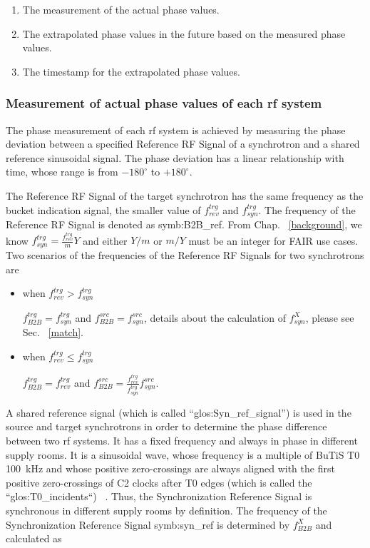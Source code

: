 \begin{enumerate}
\item The measurement of the actual phase values.
\item The extrapolated phase values in the future based on the measured phase values.
\item The timestamp for the extrapolated phase values.
\end{enumerate}
 \subsubsection{Measurement of actual phase values of each rf system}
The phase measurement of each rf system is achieved by measuring the phase deviation between a specified Reference RF Signal of a synchrotron and a shared reference sinusoidal signal. The phase deviation has a linear relationship with time, whose range is from $-180^\circ$ to $+180^\circ$. 


The Reference RF Signal of the target synchrotron has the same frequency as the bucket indication signal, the smaller value of $f_{\mathit{rev}}^{trg}$ and $f_{\mathit{syn}}^{trg}$. The frequency of the Reference RF Signal is denoted as \gls{symb:B2B_ref}. From Chap. ~\ref{background}, we know $f_{\mathit{syn}}^{trg}=\frac{f_{\mathit{rev}}^{trg}}{m}Y$ and either $Y/m$ or $m/Y$ must be an integer for FAIR use cases. Two scenarios of the frequencies of the Reference RF Signals for two synchrotrons are

\begin{itemize}
\item when $f_{\mathit{rev}}^{trg}>f_{\mathit{syn}}^{trg}$

$f_{\mathit{B2B}}^{trg}=f_{\mathit{syn}}^{trg}$ and $f_{\mathit{B2B}}^{src}=f_{\mathit{syn}}^{src}$, details about the calculation of $f_{\mathit{syn}}^{X}$, please see Sec. ~\ref{match}. 

\item when $f_{\mathit{rev}}^{trg}\le f_{\mathit{syn}}^{trg}$

$f_{\mathit{B2B}}^{trg}=f_{\mathit{rev}}^{trg}$ and $f_{\mathit{B2B}}^{src}=\frac{f_{\mathit{rev}}^{trg}}{f_{\mathit{syn}}^{trg}}f_{\mathit{syn}}^{src}$.
\end{itemize}

A shared reference signal (which is called “\gls{glos:Syn_ref_signal}”) is used in the source and target synchrotrons in order to determine the phase difference between two rf systems. It has a fixed frequency and always in phase in different supply rooms. It is a sinusoidal wave, whose frequency is a multiple of BuTiS T0 \SI{100}{kHz} and whose positive zero-crossings are always aligned with the first positive zero-crossings of C2 clocks after T0 edges (which is called the ``\gls{glos:T0_incidents}``) ~\cite{ferrand_system_2014, ferrand_system_2015}. Thus, the Synchronization Reference Signal is synchronous in different supply rooms by definition. The frequency of the Synchronization Reference Signal \gls{symb:syn_ref} is determined by $f_{\mathit{B2B}}^{X}$ and calculated as


